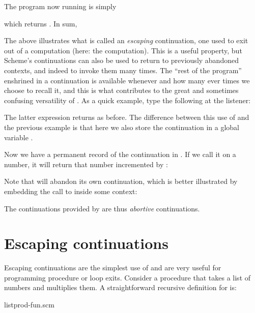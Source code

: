 
\n
The program now running is simply


\n
which returns .  In sum,


\n
The above illustrates what is called an {\em
escaping} continuation, one used to exit out of a
computation (here: the  computation).  This
is a useful property, but Scheme's continuations can
also be used to return to previously abandoned
contexts, and indeed to invoke them many times.  The
``rest of the program'' enshrined in a continuation is
available whenever and how many ever times we choose to
recall it, and this is what contributes to the great
and sometimes confusing versatility of .  As
a quick example, type the following at the listener:


\n
The latter expression returns  as before.  The
difference between this use of  and the
previous example is that here we also store the
continuation  in a global variable .

Now we have a permanent record of the continuation in
.  If we call it on a number, it will return that
number incremented by :


\n
Note that  will abandon its own continuation,
which is better illustrated by embedding the call to
 inside some context:


\n
The continuations provided by  are thus
{\em abortive} continuations.

\section{Escaping continuations}

Escaping continuations are the simplest use of
 and are very useful for programming
procedure or loop exits.  Consider a procedure
 that takes a list of numbers and
multiplies them.  A straightforward recursive
definition for  is:

\scmfilename listprod-fun.scm

